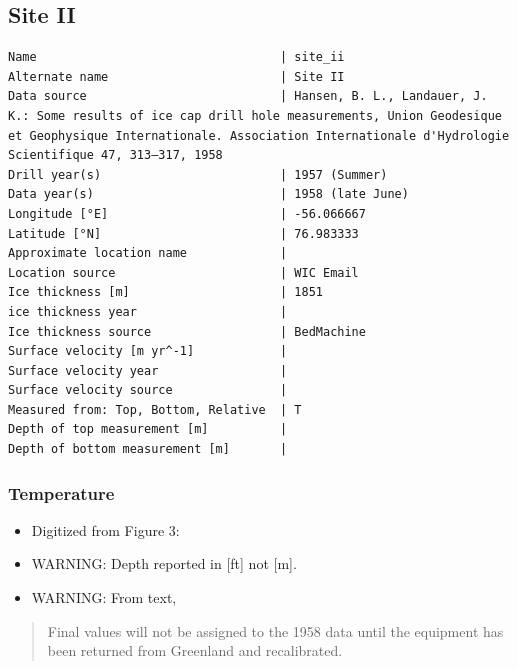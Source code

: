 \documentclass[article,a4paper,times,11pt,twoside]{article}
\begin{document}
\subsection{Site II}
\label{sec:org9761280}
\begin{verbatim}
Name                                  | site_ii
Alternate name                        | Site II
Data source                           | Hansen, B. L., Landauer, J. K.: Some results of ice cap drill hole measurements, Union Geodesique et Geophysique Internationale. Association Internationale d'Hydrologie Scientifique 47, 313–317, 1958 
Drill year(s)                         | 1957 (Summer)
Data year(s)                          | 1958 (late June)
Longitude [°E]                        | -56.066667
Latitude [°N]                         | 76.983333
Approximate location name             | 
Location source                       | WIC Email
Ice thickness [m]                     | 1851
ice thickness year                    | 
Ice thickness source                  | BedMachine
Surface velocity [m yr^-1]            | 
Surface velocity year                 | 
Surface velocity source               | 
Measured from: Top, Bottom, Relative  | T
Depth of top measurement [m]          | 
Depth of bottom measurement [m]       | 
\end{verbatim}

\subsubsection{Temperature}
\label{sec:orga1ee5c3}

\begin{itemize}
\item Digitized from \textcite{hansen_1958} Figure 3:
\item WARNING: Depth reported in [ft] not [m].
\item WARNING: From text,
\end{itemize}

\begin{quote}
Final values will not be assigned to the 1958 data until the equipment
has been returned from Greenland and recalibrated.
\end{quote}
\end{document}
